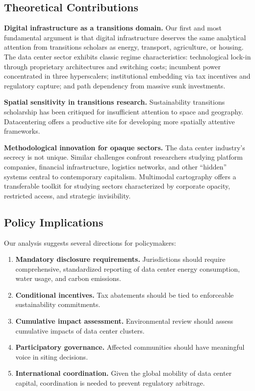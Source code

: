 \documentclass[../../main.tex]{subfiles}
\begin{document}
\subsection{Theoretical Contributions}

\textbf{Digital infrastructure as a transitions domain.} Our first and most fundamental argument is that digital infrastructure deserves the same analytical attention from transitions scholars as energy, transport, agriculture, or housing. The data center sector exhibits classic regime characteristics: technological lock-in through proprietary architectures and switching costs; incumbent power concentrated in three hyperscalers; institutional embedding via tax incentives and regulatory capture; and path dependency from massive sunk investments.

\textbf{Spatial sensitivity in transitions research.} Sustainability transitions scholarship has been critiqued for insufficient attention to space and geography. Datacentering offers a productive site for developing more spatially attentive frameworks.

\textbf{Methodological innovation for opaque sectors.} The data center industry's secrecy is not unique. Similar challenges confront researchers studying platform companies, financial infrastructure, logistics networks, and other ``hidden'' systems central to contemporary capitalism. Multimodal cartography offers a transferable toolkit for studying sectors characterized by corporate opacity, restricted access, and strategic invisibility.

\subsection{Policy Implications}

Our analysis suggests several directions for policymakers:

\begin{enumerate}
    \item \textbf{Mandatory disclosure requirements.} Jurisdictions should require comprehensive, standardized reporting of data center energy consumption, water usage, and carbon emissions.
    \item \textbf{Conditional incentives.} Tax abatements should be tied to enforceable sustainability commitments.
    \item \textbf{Cumulative impact assessment.} Environmental review should assess cumulative impacts of data center clusters.
    \item \textbf{Participatory governance.} Affected communities should have meaningful voice in siting decisions.
    \item \textbf{International coordination.} Given the global mobility of data center capital, coordination is needed to prevent regulatory arbitrage.
\end{enumerate}
\end{document}

